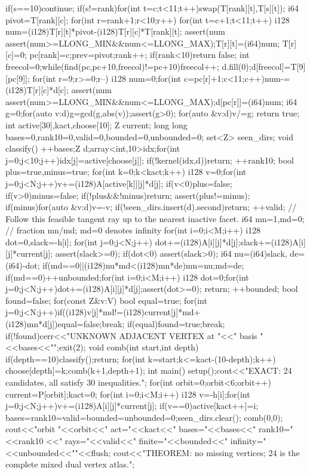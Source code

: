\documentclass[11pt,a4paper]{ctexart}
\theoremstyle{remark}\newtheorem{remark}[theorem]{备注}
\begin{document}
\begin{CodeListing}
{{  if(s==10)continue;
  if(s!=rank)for(int t=c;t<11;t++)swap(T[rank][t],T[s][t]);
  i64 pivot=T[rank][c];
  for(int r=rank+1;r<10;r++){
   for(int t=c+1;t<11;t++){
    i128 num=(i128)T[r][t]*pivot-(i128)T[r][c]*T[rank][t];
    assert(num%
    assert(num>=LLONG_MIN&&num<=LLONG_MAX);T[r][t]=(i64)num;
   }
   T[r][c]=0;
  }
  pc[rank]=c;prev=pivot;rank++;
 }
 if(rank<10)return false;
 int freecol=0;while(find(pc,pc+10,freecol)!=pc+10)freecol++;
 d.fill(0);d[freecol]=T[9][pc[9]];
 for(int r=9;r>=0;r--){
  i128 num=0;for(int c=pc[r]+1;c<11;c++)num-=(i128)T[r][c]*d[c];
  assert(num%
  assert(num>=LLONG_MIN&&num<=LLONG_MAX);d[pc[r]]=(i64)num;
 }
 i64 g=0;for(auto v:d)g=gcd(g,abs(v));assert(g>0);
 for(auto &v:d)v/=g;
 return true;
}
int active[30],kact,choose[10];
Z current;
long long bases=0,rank10=0,valid=0,bounded=0,unbounded=0;
set<Z> seen_dirs;
void classify(){
 ++bases;Z d;array<int,10>idx;for(int j=0;j<10;j++)idx[j]=active[choose[j]];
 if(!kernel(idx,d))return;
 ++rank10;
 bool plus=true,minus=true;
 for(int k=0;k<kact;k++){
  i128 v=0;for(int j=0;j<N;j++)v+=(i128)A[active[k]][j]*d[j];
  if(v<0)plus=false;
  if(v>0)minus=false;
 }
 if(!plus&&!minus)return;
 assert(plus!=minus);
 if(minus)for(auto &v:d)v=-v;
 if(!seen_dirs.insert(d).second)return;
 ++valid;
 // Follow this feasible tangent ray up to the nearest inactive facet.
 i64 mn=1,md=0; // fraction mn/md; md=0 denotes infinity
 for(int i=0;i<M;i++){
  i128 dot=0,slack=-h[i];
  for(int j=0;j<N;j++){
   dot+=(i128)A[i][j]*d[j];slack+=(i128)A[i][j]*current[j];
  }
  assert(slack>=0);
  if(dot<0){
   assert(slack>0);
   i64 nu=(i64)slack, de=(i64)-dot;
   if(md==0||(i128)nu*md<(i128)mn*de){mn=nu;md=de;}
  }
 }
 if(md==0){++unbounded;for(int i=0;i<M;i++){
  i128 dot=0;for(int j=0;j<N;j++)dot+=(i128)A[i][j]*d[j];assert(dot>=0);
 }return;}
 ++bounded;
 bool found=false;
 for(const Z&v:V){
  bool equal=true;
  for(int j=0;j<N;j++)if((i128)v[j]*md!=(i128)current[j]*md+(i128)mn*d[j]){equal=false;break;}
  if(equal){found=true;break;}
 }
 if(!found){cerr<<"UNKNOWN ADJACENT VERTEX at "<<" basis "<<bases<<"\n";exit(2);}
}
void comb(int start,int depth){
 if(depth==10){classify();return;}
 for(int k=start;k<=kact-(10-depth);k++){
  choose[depth]=k;comb(k+1,depth+1);
 }
}
int main(){
 setup();cout<<"EXACT: 24 candidates, all satisfy 30 inequalities.\n";
 for(int orbit=0;orbit<6;orbit++){
  current=P[orbit];kact=0;
  for(int i=0;i<M;i++){
   i128 v=-h[i];for(int j=0;j<N;j++)v+=(i128)A[i][j]*current[j];
   if(v==0)active[kact++]=i;
  }
  bases=rank10=valid=bounded=unbounded=0;seen_dirs.clear();
  comb(0,0);
  cout<<"orbit "<<orbit<<" act="<<kact<<" bases="<<bases<<" rank10="<<rank10
      <<" rays="<<valid<<" finite="<<bounded<<" infinity="<<unbounded<<"\n"<<flush;
 }
 cout<<"THEOREM: no missing vertices; 24 is the complete mixed dual vertex atlas.\n";
}

\end{CodeListing}
\end{document}
